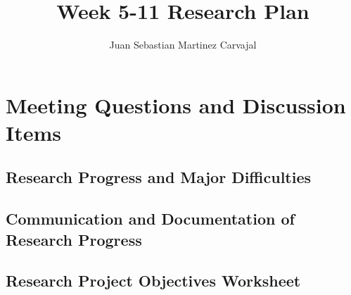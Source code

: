 \documentclass[a4paper]{journal}
\title{Week 5-11 Research Plan}
\author{Juan Sebastian Martinez Carvajal}
\date{}
\begin{document}
\maketitle
\hrulefill

\section{Meeting Questions and Discussion Items}


\subsection{Research Progress and Major Difficulties}
\subsection{Communication and Documentation of Research Progress}
\subsection{Research Project Objectives Worksheet}
\end{document}
